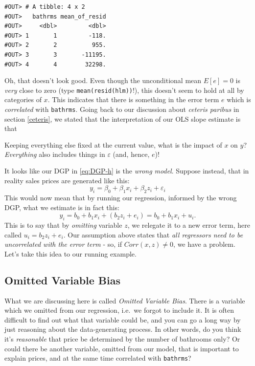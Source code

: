 \documentclass[]{book}
\newenvironment{tip}{\begin{tcolorbox}[colback=green!5!white,colframe=green,title=\textbf{Tip:}]}{\end{tcolorbox}}
\theoremstyle{definition}
\theoremstyle{definition}
\theoremstyle{definition}
\theoremstyle{remark}
\begin{document}
\begin{verbatim}
#OUT> # A tibble: 4 x 2
#OUT>   bathrms mean_of_resid
#OUT>     <dbl>         <dbl>
#OUT> 1       1         -118.
#OUT> 2       2          955.
#OUT> 3       3       -11195.
#OUT> 4       4        32298.
\end{verbatim}

Oh, that doesn't look good. Even though the unconditional mean
\(E[e] = 0\) is \emph{very} close to zero (type
\texttt{mean(resid(hlm))}!), this doesn't seem to hold at all by
categories of \(x\). This indicates that there is something in the error
term \(e\) which is \emph{correlated} with \texttt{bathrms}. Going back
to our discussion about \emph{ceteris paribus} in section \ref{ceteris},
we stated that the interpretation of our OLS slope estimate is that

\begin{tip}
Keeping everything else fixed at the current value, what is the impact
of \(x\) on \(y\)? \emph{Everything} also includes things in
\(\varepsilon\) (and, hence, \(e\))!
\end{tip}

 It looks like our DGP in \eqref{eq:DGP-h} is the \emph{wrong model}.
Suppose instead, that in reality sales prices are generated like this:
\[
y_i = \beta_0 + \beta_1 x_i + \beta_2 z_i + \varepsilon_i \label{eq:DGP-h2}
\] This would now mean that by running our regression, informed by the
wrong DGP, what we estimate is in fact this: \[
y_i = b_0 + b_1 x_i + (b_2 z_i + e_i)  = b_0 + b_1 x_i + u_i.
\] This is to say that by \emph{omitting} variable \(z\), we relegate it
to a new error term, here called \(u_i = b_2 z_i + e_i\). Our assumption
above states that \emph{all regressors need to be uncorrelated with the
error term} - so, if \(Corr(x,z)\neq 0\), we have a problem. Let's take
this idea to our running example.

\subsection{Omitted Variable Bias}\label{omitted-variable-bias}

What we are discussing here is called \emph{Omitted Variable Bias}.
There is a variable which we omitted from our regression, i.e.~we forgot
to include it. It is often difficult to find out what that variable
could be, and you can go a long way by just reasoning about the
data-generating process. In other words, do you think it's
\emph{reasonable} that price be determined by the number of bathrooms
only? Or could there be another variable, omitted from our model, that
is important to explain prices, and at the same time correlated with
\texttt{bathrms}?
\end{document}
